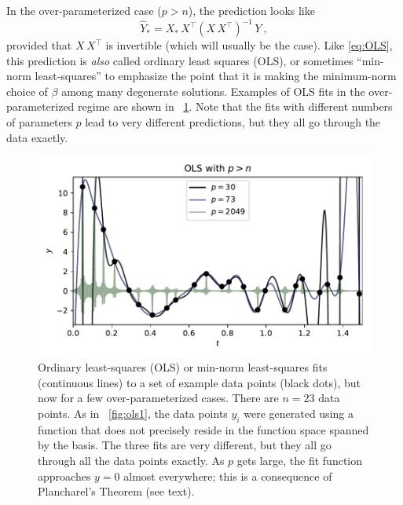 \documentclass[12pt,letterpaper]{article}
\newlength{\figurewidth}
\begin{document}
In the over-parameterized case ($p>n$), the prediction looks like
\begin{equation}\label{eq:OLS2}
    \hat{Y}_\ast = X_\ast\,X^\top (X\,X^\top)^{-1}\,Y
    ~,
\end{equation}
provided that $X\,X^\top$ is invertible (which will usually be the case).
Like \eqref{eq:OLS}, this prediction is \emph{also} called ordinary least squares (OLS), or sometimes ``min-norm least-squares'' to emphasize the point that it is making the minimum-norm choice of $\beta$ among many degenerate solutions.
Examples of OLS fits in the over-parameterized regime are shown in \figurename~\ref{fig:ols2}.
Note that the fits with different numbers of parameters $p$ lead to very different predictions, but they all go through the data exactly.
\begin{figure}[t]
    \begin{mdframed}
    \includegraphics[width=\figurewidth]{paper/OLS-over.pdf}
    \caption{Ordinary least-squares (OLS) or min-norm least-squares fits (continuous lines) to a set of example data points (black dots), but now for a few over-parameterized cases. There are $n=23$ data points. As in \figurename~\ref{fig:ols1}, the data points $y_i$ were generated using a function that does not precisely reside in the function space spanned by the basis. The three fits are very different, but they all go through all the data points exactly. As $p$ gets large, the fit function approaches $y=0$ almost everywhere; this is a consequence of Plancharel's Theorem (see text).}
    \label{fig:ols2}
    \end{mdframed}
\end{figure}
\end{document}
